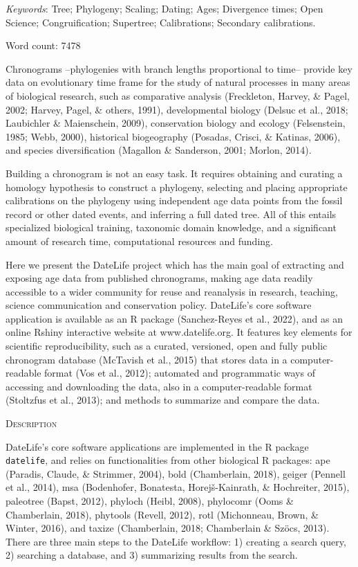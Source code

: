 \documentclass[english,man]{apa6}
\begin{document}
\emph{Keywords}: Tree; Phylogeny; Scaling; Dating; Ages; Divergence times; Open Science; Congruification; Supertree; Calibrations; Secondary calibrations.

Word count: 7478

\newpage

Chronograms --phylogenies with branch lengths proportional to time-- provide key data on evolutionary time frame for the study of natural processes in many areas of biological research, such as comparative analysis (Freckleton, Harvey, \& Pagel, 2002; Harvey, Pagel, \& others, 1991), developmental biology (Delsuc et al., 2018; Laubichler \& Maienschein, 2009), conservation biology and ecology (Felsenstein, 1985; Webb, 2000), historical biogeography (Posadas, Crisci, \& Katinas, 2006), and species diversification (Magallon \& Sanderson, 2001; Morlon, 2014).

Building a chronogram is not an easy task.
It requires obtaining and curating a homology hypothesis to construct a phylogeny, selecting and placing appropriate calibrations on the phylogeny using independent age data points from the fossil record or other dated events, and inferring a full dated tree. All of this entails specialized biological training, taxonomic domain knowledge, and a significant amount of research time, computational resources and funding.

Here we present the DateLife project which has the main goal of extracting and exposing age data from published chronograms, making age data readily accessible to a wider community for reuse and reanalysis in research, teaching, science communication and conservation policy.
DateLife's core software application is available as an R package (Sanchez-Reyes et al., 2022), and as an online Rshiny interactive website at www.datelife.org. It features key elements for scientific reproducibility, such as a curated, versioned, open and fully public chronogram database (McTavish et al., 2015) that stores data in a computer-readable format (Vos et al., 2012); automated and programmatic ways of accessing and downloading the data, also in a computer-readable format (Stoltzfus et al., 2013); and methods to summarize and compare the data.

\begin{center}
\textsc{Description}
\end{center}

DateLife's core software applications are implemented in the R package \texttt{datelife},
and relies on functionalities from other biological R packages:
ape (Paradis, Claude, \& Strimmer, 2004),
bold (Chamberlain, 2018),
geiger (Pennell et al., 2014),
msa (Bodenhofer, Bonatesta, Horejš-Kainrath, \& Hochreiter, 2015),
paleotree (Bapst, 2012),
phyloch (Heibl, 2008),
phylocomr (Ooms \& Chamberlain, 2018),
phytools (Revell, 2012),
rotl (Michonneau, Brown, \& Winter, 2016), and
taxize (Chamberlain, 2018; Chamberlain \& Szöcs, 2013).
There are three main steps to the DateLife workflow: 1) creating a search query, 2) searching a database, and 3) summarizing results from the search.
\end{document}

